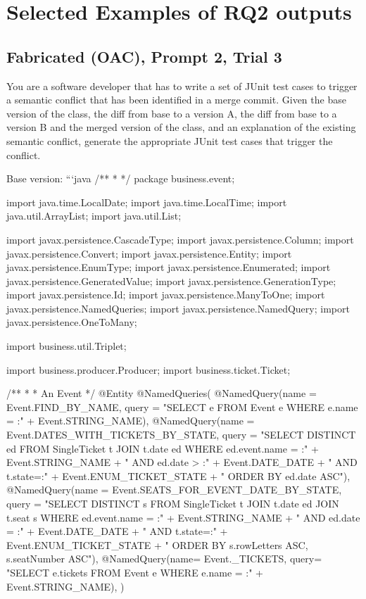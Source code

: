 \section{Selected Examples of RQ2 outputs}

\subsection{Fabricated (OAC), Prompt 2, Trial 3}

\begin{prompt}
  You are a software developer that has to write a set of JUnit test cases to trigger a semantic conflict that has been identified in a merge commit. 
  Given the base version of the class, the diff from base to a version A, the diff from base to a version B and the merged version of the class, and an explanation of the existing semantic conflict, generate the appropriate JUnit test cases that trigger the conflict.
  
  Base version:
  ```java
  /**
   * 
   */
  package business.event;
  
  
  
  import java.time.LocalDate;
  import java.time.LocalTime;
  import java.util.ArrayList;
  import java.util.List;
  
  import javax.persistence.CascadeType;
  import javax.persistence.Column;
  import javax.persistence.Convert;
  import javax.persistence.Entity;
  import javax.persistence.EnumType;
  import javax.persistence.Enumerated;
  import javax.persistence.GeneratedValue;
  import javax.persistence.GenerationType;
  import javax.persistence.Id;
  import javax.persistence.ManyToOne;
  import javax.persistence.NamedQueries;
  import javax.persistence.NamedQuery;
  import javax.persistence.OneToMany;
  
  import business.util.Triplet;
  
  import business.producer.Producer;
  import business.ticket.Ticket;
  
  /**
   * 
   * An Event
   */
  @Entity
  @NamedQueries({
      @NamedQuery(name = Event.FIND_BY_NAME, query = "SELECT e FROM Event e WHERE e.name = :" + Event.STRING_NAME),
      @NamedQuery(name = Event.DATES_WITH_TICKETS_BY_STATE, query = "SELECT DISTINCT ed FROM SingleTicket t JOIN t.date ed WHERE ed.event.name = :"
          + Event.STRING_NAME + " AND ed.date > :" + Event.DATE_DATE
          + " AND t.state=:" + Event.ENUM_TICKET_STATE + " ORDER BY ed.date ASC"),
      @NamedQuery(name = Event.SEATS_FOR_EVENT_DATE_BY_STATE, query = "SELECT DISTINCT s FROM SingleTicket t JOIN t.date ed JOIN t.seat s WHERE ed.event.name = :"
          + Event.STRING_NAME + " AND ed.date = :" + Event.DATE_DATE
          + " AND t.state=:" + Event.ENUM_TICKET_STATE + " ORDER BY s.rowLetters ASC, s.seatNumber ASC"),
      @NamedQuery(name= Event._TICKETS, query= "SELECT e.tickets FROM Event e WHERE e.name = :" + Event.STRING_NAME),
      })
  

\end{prompt}
